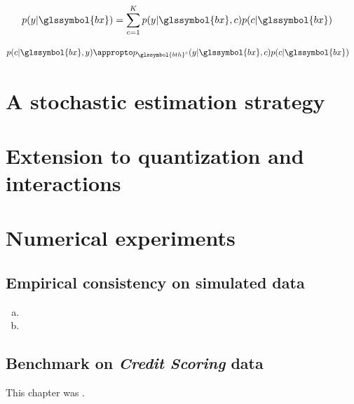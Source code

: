 \begin{align*}
p(y | \glssymbol{bx}) & = \sum_{c = 1}^K p(y | \glssymbol{bx}, c) p(c | \glssymbol{bx})
\end{align*}


\begin{align*}
p(c | \glssymbol{bx}, y) & \appropto p_{\glssymbol{bth}^c}(y | \glssymbol{bx}, c) p(c | \glssymbol{bx})
\end{align*}


\section{A stochastic estimation strategy}




\section{Extension to quantization and interactions}



\section{Numerical experiments} \label{sec:num_exp}



\subsection{Empirical consistency on simulated data} \label{subsec:num_sim}


\begin{enumerate}[(a)]
\item 
\item 
\end{enumerate}

\subsection{Benchmark on \textit{Credit Scoring} data}




\bigskip

This chapter was .


\printbibliography[heading=subbibliography, title=References of Chapter 5]

